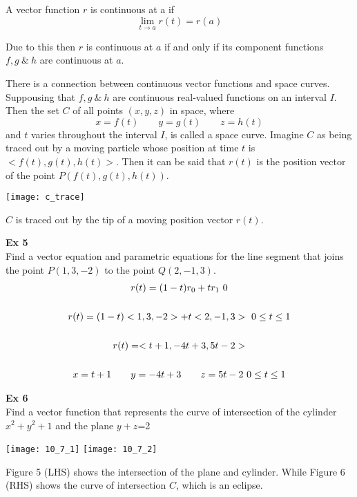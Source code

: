 \documentclass{article}
\begin{document}
  A vector function $ r $ is continuous at a if
  \[
    \lim_{t \to a}{r(t)}=r(a)
  \]
  
  Due to this then $ r $ is continuous at $ a $ if and only if its component functions $ f,g ~\&~ h $ are continuous at $ a $.

  There is a connection between continuous vector functions and space curves. Suppousing that $ f,g ~\&~ h $ are continuous real-valued functions on an interval $ I $. Then the set $ C $ of all points $ (x,y,z) $ in space, where
  \[
      x=f(t) \qquad y=g(t) \qquad z=h(t)
  \]
  and $ t $ varies throughout the interval $ I $, is called a space curve. Imagine $ C $ as being traced out by a moving particle whose position at time $ t $ is $ < f(t), g(t), h(t) >  $. Then it can be said that $ r(t) $ is the position vector of the point $ P(f(t),g(t),h(t)) $.
  \begin{center}
      \texttt{[image: c\_trace]}
  \end{center}

  $ C $ is traced out by the tip of a moving position vector $ r(t) $.

  \textbf{Ex 5}\\
  Find a vector equation and parametric equations for the line segment that joins the point $ P(1,3,-2) $ to the point $ Q(2,-1,3) $.
  \[
    \begin{gathered}
      r(t)=(1-t)r_{0}+tr_{1}~0\let\le1\\
      ~\\
      r(t)=(1-t)< 1, 3, -2 > +t< 2, -1, 3 > ~0\le t \le 1\\
      ~\\
     r(t) = < t+1, -4t+3, 5t-2 >\\
     ~\\
     x=t+1 \qquad y=-4t+3 \qquad z=5t-2~0\le t \le 1
    \end{gathered}
  \]

  \textbf{Ex 6}\\
  Find a vector function that represents the curve of intersection of the cylinder $ x^{2}+y^{2}+1$ and the plane $ y+z $=2
  \begin{center}
      \texttt{[image: 10\_7\_1]}
      \texttt{[image: 10\_7\_2]}
  \end{center}
  Figure 5 (LHS) shows the intersection of the plane and cylinder. While Figure 6 (RHS) shows the curve of intersection $ C $, which is an eclipse.
\end{document}
